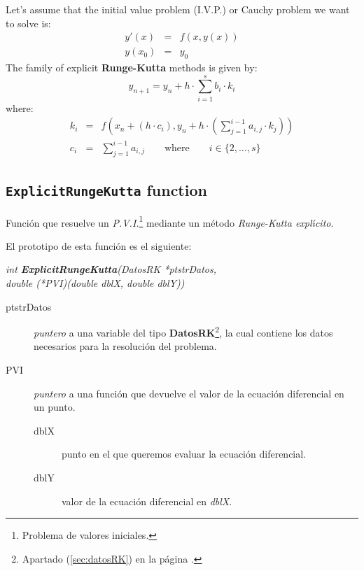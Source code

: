 Let's assume that the initial value problem (I.V.P.) or Cauchy problem we want to solve is:
%
\begin{eqnarray*}
  y'(x) & = & f(x, y(x)) \\
  y(x_0) & = & y_0
\end{eqnarray*}
%
The family of explicit \textbf{Runge-Kutta} methods is given by:
%
\begin{displaymath}
  y_{n+1} = y_n  + h \cdot \sum_{i=1}^s b_i \cdot k_i
\end{displaymath}
%
where:
%
\begin{eqnarray*}
  k_i & = & f(x_n + (h\cdot c_i), y_n + h\cdot \left(\sum_{j=1}^{i-1} a_{i,j} \cdot k_j \right) )\\
  c_i & = & \sum_{j=1}^{i-1} a_{i,j} \qquad \textrm{where} \qquad i \in \{2,\dots,s\}
\end{eqnarray*}

\subsection{\texttt{ExplicitRungeKutta} function}

Funci\'on que resuelve un \emph{P.V.I.}\footnote{Problema de valores 
iniciales.} mediante un m\'etodo \emph{Runge-Kutta expl\'{\i}cito}.\newline

El prototipo de esta funci\'on es el siguiente:

\begin{center}
\emph{int \textbf{ExplicitRungeKutta}(DatosRK *ptstrDatos,\\
double (*PVI)(double dblX, double dblY))}
\end{center} 

\begin{description}
\item[ptstrDatos] \emph{puntero} a una variable del tipo 
\textbf{DatosRK}\footnote{Apartado (\ref{sec:datosRK}) en la p\'agina 
\pageref{sec:datosRK}.}, la cual contiene los datos necesarios para
la resoluci\'on del problema.
\item[PVI] \emph{puntero} a una funci\'on que devuelve el valor de la
ecuaci\'on diferencial en un punto.
\begin{description}
	\item[dblX] punto en el que queremos evaluar la ecuaci\'on diferencial.
	\item[dblY] valor de la ecuaci\'on diferencial en \emph{dblX}.
\end{description}
\end{description}

